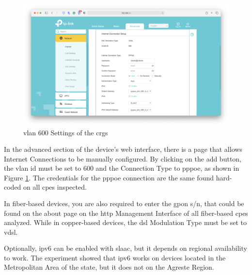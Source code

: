 \begin{figure}[h]
    \centering
    \includegraphics[width=\linewidth]{contents/substituting-the-isp-cpe/internet/advanced-network-internet-vlan600.png}
    \caption{\gls{vlan} 600 Settings of the \gls{crg}s}
    \label{figure:crgs_vlan600}
\end{figure}

In the advanced section of the device’s web interface, there is a page that allows Internet Connections to be manually configured. By clicking on the add button, the \gls{vlan} \gls{id} must be set to 600 and the Connection Type to \gls{pppoe}, as shown in Figure \ref{figure:crgs_vlan600}. The credentials for the \gls{pppoe} connection are the same found hard-coded on all \glspl{cpe} inspected.

In fiber-based devices, you are also required to enter the \gls{gpon} \gls{s/n}, that could be found on the about page on the \gls{http} Management Interface of all fiber-based \glspl{cpe} analyzed. While in copper-based devices, the \gls{dsl} Modulation Type must be set to \gls{vdsl}.

Optionally, \gls{ip}v6 can be enabled with \gls{slaac}, but it depends on regional availability to work. The experiment showed that \gls{ip}v6 works on devices located in the Metropolitan Area of the state, but it does not on the Agreste Region.

\FloatBarrier
